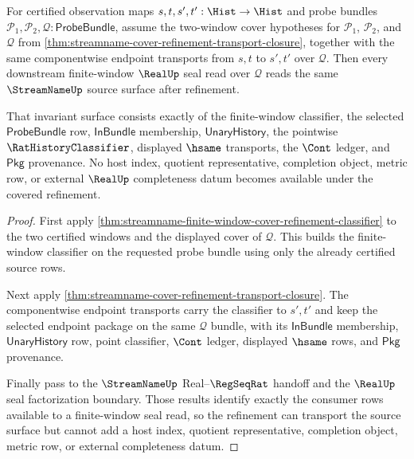 \begin{theorem}
\label{thm:streamname-cover-refinement-real-seal-source-invariance}
For certified observation maps $s,t,s',t':\Hist\to\Hist$ and probe bundles
$\mathcal{P}_1,\mathcal{P}_2,\mathcal{Q}:\mathsf{ProbeBundle}$, assume the
two-window cover hypotheses for $\mathcal{P}_1$, $\mathcal{P}_2$, and
$\mathcal{Q}$ from
\autoref{thm:streamname-cover-refinement-transport-closure}, together with
the same componentwise endpoint transports from $s,t$ to $s',t'$ over
$\mathcal{Q}$. Then every downstream finite-window $\RealUp$ seal read over
$\mathcal{Q}$ reads the same $\StreamNameUp$ source surface after refinement.

That invariant surface consists exactly of the finite-window classifier, the
selected $\mathsf{ProbeBundle}$ row, $\mathsf{InBundle}$ membership,
$\mathsf{UnaryHistory}$, the pointwise $\RatHistoryClassifier$, displayed
$\hsame$ transports, the $\Cont$ ledger, and $\mathsf{Pkg}$ provenance. No
host index, quotient representative, completion object, metric row, or
external $\RealUp$ completeness datum becomes available under the covered
refinement.
\end{theorem}
\begin{proof}
First apply
\autoref{thm:streamname-finite-window-cover-refinement-classifier} to the
two certified windows and the displayed cover of $\mathcal{Q}$. This builds
the finite-window classifier on the requested probe bundle using only the
already certified source rows.

Next apply
\autoref{thm:streamname-cover-refinement-transport-closure}. The
componentwise endpoint transports carry the classifier to $s',t'$ and keep the
selected endpoint package on the same $\mathcal{Q}$ bundle, with its
$\mathsf{InBundle}$ membership, $\mathsf{UnaryHistory}$ row, point classifier,
$\Cont$ ledger, displayed $\hsame$ rows, and $\mathsf{Pkg}$ provenance.

Finally pass to the $\StreamNameUp$ Real--$\RegSeqRat$ handoff and the
$\RealUp$ seal factorization boundary. Those results identify exactly the
consumer rows available to a finite-window seal read, so the refinement can
transport the source surface but cannot add a host index, quotient
representative, completion object, metric row, or external completeness
datum.
\end{proof}
